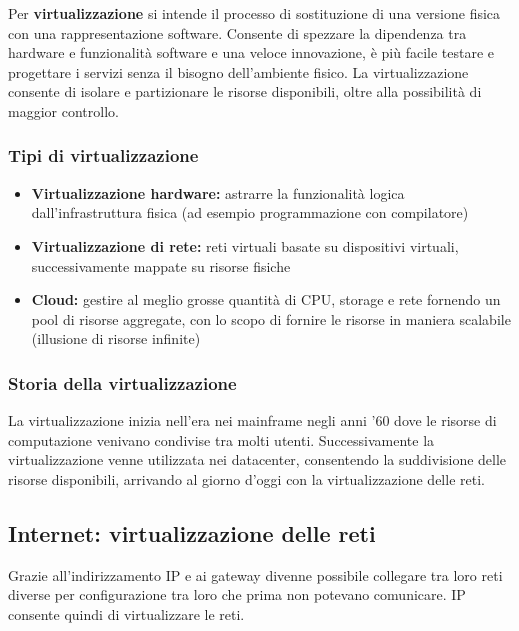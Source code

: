 \documentclass{report}
\begin{document}
Per \textbf{virtualizzazione} si intende il processo di sostituzione di
una versione fisica con una rappresentazione software. Consente di
spezzare la dipendenza tra hardware e funzionalità software e una veloce
innovazione, è più facile testare e progettare i servizi senza il
bisogno dell'ambiente fisico. La virtualizzazione consente di isolare e
partizionare le risorse disponibili, oltre alla possibilità di maggior
controllo.

\hypertarget{header-n275}{%
\subsubsection{Tipi di virtualizzazione}\label{header-n275}}

\begin{itemize}
\item
  \textbf{Virtualizzazione hardware:} astrarre la funzionalità logica
  dall'infrastruttura fisica (ad esempio programmazione con compilatore)
\item
  \textbf{Virtualizzazione di rete: }reti virtuali basate su dispositivi
  virtuali, successivamente mappate su risorse fisiche
\item
  \textbf{Cloud: }gestire al meglio grosse quantità di CPU, storage e
  rete fornendo un pool di risorse aggregate, con lo scopo di fornire le
  risorse in maniera scalabile (illusione di risorse infinite)
\end{itemize}

\hypertarget{header-n283}{%
\subsubsection{Storia della virtualizzazione}\label{header-n283}}

La virtualizzazione inizia nell'era nei mainframe negli anni '60 dove le
risorse di computazione venivano condivise tra molti utenti.
Successivamente la virtualizzazione venne utilizzata nei datacenter,
consentendo la suddivisione delle risorse disponibili, arrivando al
giorno d'oggi con la virtualizzazione delle reti.

\hypertarget{header-n285}{%
\subsection{Internet: virtualizzazione delle reti}\label{header-n285}}

Grazie all'indirizzamento IP e ai gateway divenne possibile collegare
tra loro reti diverse per configurazione tra loro che prima non potevano
comunicare. IP consente quindi di virtualizzare le reti.
\end{document}
